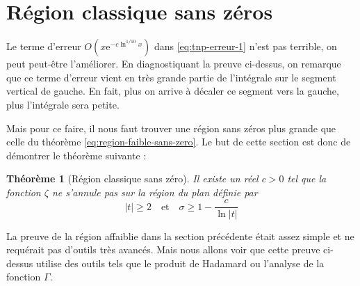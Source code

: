 \documentclass[french]{report}
\newtheorem{theorem}{Théorème}[section]
\begin{document}
\section{Région classique sans zéros}

Le terme d'erreur $O(x\mathrm{e}^{-c\ln^{1/10}x})$ dans \ref{eq:tnp-erreur-1} n'est pas terrible, on peut peut-être l'améliorer. En diagnostiquant la preuve ci-dessus, on remarque que ce terme d'erreur vient en très grande partie de l'intégrale sur le segment vertical de gauche. En fait, plus on arrive à décaler ce segment vers la gauche, plus l'intégrale sera petite.

Mais pour ce faire, il nous faut trouver une région sans zéros plus grande que celle du théorème \ref{eq:region-faible-sans-zero}. Le but de cette section est donc de démontrer le théorème suivante :

\begin{theorem}[Région classique sans zéro]\label{eq:region-classique-sans-zero}
  Il existe un réel $c>0$ tel que la fonction $\zeta$ ne s'annule pas sur la région du plan définie par
  \[ |t|\geq2 \quad \mathrm{et} \quad \sigma\geq1-\frac{c}{\ln|t|} \]
\end{theorem}

La preuve de la région affaiblie dans la section précédente était assez simple et ne requérait pas d'outils très avancés. Mais nous allons voir que cette preuve ci-dessus utilise des outils tels que le produit de Hadamard ou l'analyse de la fonction $\Gamma$.
\end{document}
